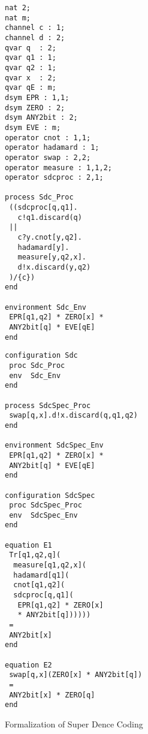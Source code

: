 \begin{figure}
\begin{minipage}{0.5\hsize}
\begin{verbatim}
nat 2;
nat m;
channel c : 1;
channel d : 2;
qvar q  : 2;
qvar q1 : 1;
qvar q2 : 1;
qvar x  : 2;
qvar qE : m;
dsym EPR : 1,1;
dsym ZERO : 2;
dsym ANY2bit : 2;
dsym EVE : m;
operator cnot : 1,1;
operator hadamard : 1;
operator swap : 2,2;
operator measure : 1,1,2;
operator sdcproc : 2,1;

process Sdc_Proc
 ((sdcproc[q,q1].
   c!q1.discard(q)
 ||
   c?y.cnot[y,q2].
   hadamard[y].
   measure[y,q2,x].
   d!x.discard(y,q2)
 )/{c})
end

environment Sdc_Env
 EPR[q1,q2] * ZERO[x] *
 ANY2bit[q] * EVE[qE]
end
\end{verbatim}
\end{minipage}
\begin{minipage}{0.5\hsize}
\begin{verbatim}
configuration Sdc
 proc Sdc_Proc
 env  Sdc_Env
end

process SdcSpec_Proc
 swap[q,x].d!x.discard(q,q1,q2)
end

environment SdcSpec_Env
 EPR[q1,q2] * ZERO[x] *
 ANY2bit[q] * EVE[qE]
end

configuration SdcSpec
 proc SdcSpec_Proc
 env  SdcSpec_Env
end

equation E1
 Tr[q1,q2,q](
  measure[q1,q2,x](
  hadamard[q1](
  cnot[q1,q2](
  sdcproc[q,q1](
   EPR[q1,q2] * ZERO[x]
   * ANY2bit[q])))))
 = 
 ANY2bit[x]
end

equation E2
 swap[q,x](ZERO[x] * ANY2bit[q])
 =
 ANY2bit[x] * ZERO[q]
end
\end{verbatim}
\end{minipage}
\caption{Formalization of Super Dence Coding}
\label{fml:codesdc}
\end{figure}

